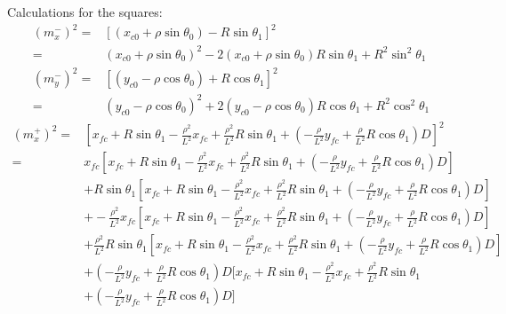 \documentclass[12pt]{article}
\begin{document}
Calculations for the squares:
\begin{align}
    (m^-_x)^2 =& [ (x_{c0}+\rho\sin\theta_0) -R\sin\theta_1 ]^2\\
    =& (x_{c0}+\rho\sin\theta_0)^2 -2(x_{c0}+\rho\sin\theta_0)R\sin\theta_1  +R^2\sin^2\theta_1\\
    (m^-_y)^2 =& [(y_{c0}- \rho\cos\theta_0) + R\cos\theta_1 ]^2\\
    =& (y_{c0}- \rho\cos\theta_0)^2 + 2(y_{c0}- \rho\cos\theta_0)R\cos\theta_1  + R^2\cos^2\theta_1
\end{align}
\begin{align}
    (m^+_x)^2 =& [x_{fc} +R\sin\theta_1 -\frac{\rho^2}{L^2}x_{fc} + \frac{\rho^2}{L^2}R\sin\theta_1 + (-\frac{\rho}{L^2}y_{fc} +\frac{\rho}{L^2}R\cos\theta_1)D]^2\\
    =& x_{fc}[x_{fc} +R\sin\theta_1 -\frac{\rho^2}{L^2}x_{fc} + \frac{\rho^2}{L^2}R\sin\theta_1 + (-\frac{\rho}{L^2}y_{fc} +\frac{\rho}{L^2}R\cos\theta_1)D]  \nonumber\\
    &+ R\sin\theta_1[x_{fc} +R\sin\theta_1 -\frac{\rho^2}{L^2}x_{fc} + \frac{\rho^2}{L^2}R\sin\theta_1 + (-\frac{\rho}{L^2}y_{fc} +\frac{\rho}{L^2}R\cos\theta_1)D]   \nonumber\\
    &+ -\frac{\rho^2}{L^2}x_{fc}[x_{fc} +R\sin\theta_1 -\frac{\rho^2}{L^2}x_{fc} + \frac{\rho^2}{L^2}R\sin\theta_1 + (-\frac{\rho}{L^2}y_{fc} +\frac{\rho}{L^2}R\cos\theta_1)D]  \nonumber\\
    &+ \frac{\rho^2}{L^2}R\sin\theta_1[x_{fc} +R\sin\theta_1 -\frac{\rho^2}{L^2}x_{fc} + \frac{\rho^2}{L^2}R\sin\theta_1 + (-\frac{\rho}{L^2}y_{fc} +\frac{\rho}{L^2}R\cos\theta_1)D]  \nonumber\\
    &+ (-\frac{\rho}{L^2}y_{fc} +\frac{\rho}{L^2}R\cos\theta_1)D[x_{fc} +R\sin\theta_1 -\frac{\rho^2}{L^2}x_{fc} + \frac{\rho^2}{L^2}R\sin\theta_1 \nonumber\\ &+ (-\frac{\rho}{L^2}y_{fc} +\frac{\rho}{L^2}R\cos\theta_1)D]  \\
\end{align}
\end{document}
